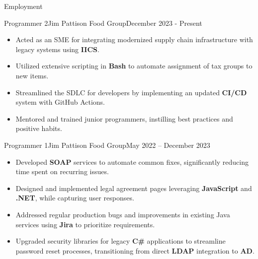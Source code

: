 \documentclass[]{mcdowellcv}
\begin{document}
	\makeheader
	
	\begin{cvsection}{Employment}
		\begin{cvsubsection}{Programmer 2}{Jim Pattison Food Group}{December 2023 - Present}		
			\begin{itemize}
				\item Acted as an SME for integrating modernized supply chain infrastructure with legacy systems using \textbf{IICS}.
				\item Utilized extensive scripting in \textbf{Bash} to automate assignment of tax groups to new items.
				\item Streamlined the SDLC for developers by implementing an updated \textbf{CI/CD} system with GitHub Actions.
				\item Mentored and trained junior programmers, instilling best practices and positive habits.
			\end{itemize}
		\end{cvsubsection}
		
		\begin{cvsubsection}{Programmer 1}{Jim Pattison Food Group}{May 2022 -- December 2023}	
			\begin{itemize}
				\item Developed \textbf{SOAP} services to automate common fixes, significantly reducing time spent on recurring issues.
				\item Designed and implemented legal agreement pages leveraging \textbf{JavaScript} and \textbf{.NET}, while capturing user responses.
				\item Addressed regular production bugs and improvements in existing Java services using \textbf{Jira} to prioritize requirements.
				\item Upgraded security libraries for legacy \textbf{C\#} applications to streamline password reset processes, transitioning from direct \textbf{LDAP} integration to \textbf{AD}.
			\end{itemize}
		\end{cvsubsection}
	\end{cvsection}
	
\end{document}
